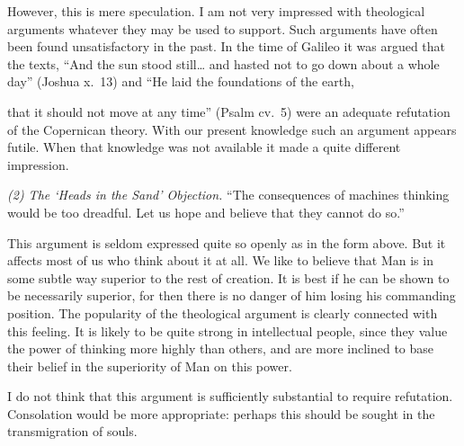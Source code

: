 \documentclass[10pt]{article} %
\begin{document}
However, this is mere speculation. I am not very impressed with theological arguments whatever they may be used to support. Such arguments have often been found unsatisfactory in the past. In the time of Galileo it was argued that the texts, ``And the sun stood still\dots{} and hasted not to go down about a whole day'' (Joshua x.~13) and ``He laid the foundations of the earth,

that it should not move at any time'' (Psalm cv.~5) were an adequate refutation of the Copernican theory. With our present knowledge such an argument appears futile. When that knowledge was not available it made a quite different impression.
\vspace{0.5\baselineskip} %

\noindent\normalfont \textit{(2) The `Heads in the Sand' Objection.} ``The consequences of machines thinking would be too dreadful. Let us hope and believe that they cannot do so.''

This argument is seldom expressed quite so openly as in the form above. But it affects most of us who think about it at all. We like to believe that Man is in some subtle way superior to the rest of creation. It is best if he can be shown to be necessarily superior, for then there is no danger of him losing his commanding position. The popularity of the theological argument is clearly connected with this feeling. It is likely to be quite strong in intellectual people, since they value the power of thinking more highly than others, and are more inclined to base their belief in the superiority of Man on this power.

I do not think that this argument is sufficiently substantial to require refutation. Consolation would be more appropriate: perhaps this should be sought in the transmigration of souls.
\vspace{0.5\baselineskip} %
\end{document}
